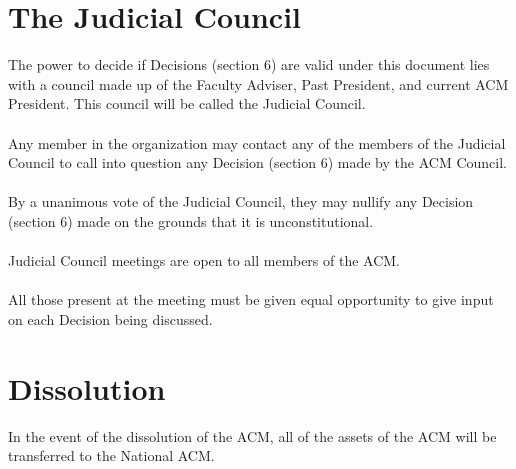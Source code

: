 \documentclass[12pt,titlepage]{article}
\begin{document}
\section{The Judicial Council}

The power to decide if Decisions (section 6) are valid under this document lies with a council made up of the Faculty Adviser, Past President, and current ACM President. This council will be called the Judicial Council.\\
\\
Any member in the organization may contact any of the members of the Judicial Council to call into question any Decision (section 6) made by the ACM Council.\\
\\
By a unanimous vote of the Judicial Council, they may nullify any Decision (section 6) made on the grounds that it is unconstitutional.\\
\\
Judicial Council meetings are open to all members of the ACM.\\
\\
All those present at the meeting must be given equal opportunity to give input on each Decision being discussed.

\section{Dissolution}

In the event of the dissolution of the ACM, all of the assets of the ACM will be transferred to the National ACM.
\end{document}
